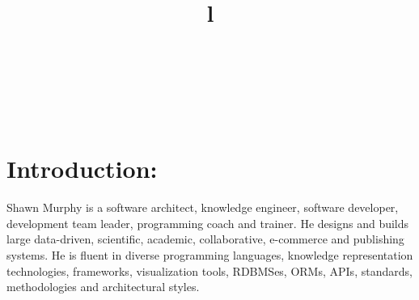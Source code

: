 \documentclass[line,margin]{res}
\begin{document}
 \address{\url{http://smurp.com}\\ Saltspring \& Berlin\\
 \href{callto:+491625808994}{+491625808994}\\
  {\tt \href{mailto:smurp@smurp.com}{smurp@smurp.com}}}

\resumewidth=7in
\textheight=10.2in
\begin{resume}

\begin{format}
\title{l}\\
\\
\body\\
\end{format}


\section{Introduction:}
\begin{par}

Shawn Murphy is a software architect, knowledge engineer,
software developer, development team leader, programming coach
and trainer.
He designs and builds large data-driven, scientific, academic,
collaborative, e-commerce and publishing systems.
He is fluent in diverse programming languages, knowledge
representation technologies, frameworks, visualization tools, RDBMSes,
ORMs, APIs, standards, methodologies and architectural styles.

\begin{comment}
Examples of his work include:
  a vehicle fleet tracking system with RESTful API;
  multiple dynamic knowledge visualization systems;
  a custom database publishing system used by the largest real estate
    markets in Western Canada;
  real-estate systems powered by his own RETS implementation;
  a large bibliographic collaboration system seeded with Library of Congress data;
  a Laboratory Information Management System for disease diagnosis which
    captured, processed and reported on disparate scientific data streams;
  recruiting management systems;
  numerous B2B and B2C e-commerce technologies and systems
    (handling both digital and tangible goods);
  and many other projects involving sophisticated data-sets and processing.
\end{comment}


\end{par}
\end{resume}
\end{document}

